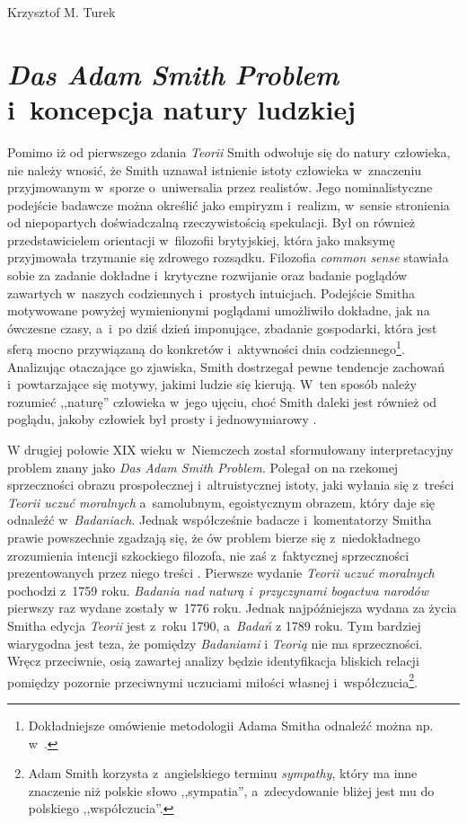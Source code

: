 \begin{artplenv}{Krzysztof M. Turek}
\section{\textit{Das Adam Smith Problem} i~koncepcja natury ludzkiej}

Pomimo iż od pierwszego zdania \textit{Teorii} Smith
\parencite*[s.~5]{smith_teoria_1989}
odwołuje się do natury
człowieka, nie należy wnosić, że Smith uznawał istnienie istoty człowieka w~znaczeniu
przyjmowanym w~sporze o~uniwersalia przez realistów. Jego nominalistyczne podejście
badawcze można określić jako empiryzm i~realizm, w~sensie
stronienia od niepopartych doświadczalną rzeczywistością spekulacji. Był on również przedstawicielem
orientacji w~filozofii brytyjskiej, która jako maksymę przyjmowała trzymanie się zdrowego rozsądku.
Filozofia \textit{common sense} stawiała sobie za zadanie dokładne i~krytyczne
rozwijanie oraz badanie poglądów zawartych w~naszych
codziennych i~prostych intuicjach. Podejście Smitha motywowane powyżej
wymienionymi poglądami umożliwiło dokładne, jak na ówczesne
czasy, a~i~po dziś dzień imponujące, zbadanie gospodarki, która jest sferą mocno przywiązaną do konkretów i~aktywności
dnia codziennego\footnote{Dokładniejsze omówienie metodologii Adama Smitha odnaleźć
można np. w~\parencites[rozdz.~I–III]{fleischacker_adam_2005}[rozdz.~8 i~9]{myers_soul_1983}.
}. Analizując otaczające go
zjawiska, Smith dostrzegał pewne tendencje zachowań i~powtarzające się motywy, jakimi ludzie się kierują. W~ten sposób
należy rozumieć ,,naturę'' człowieka w~jego ujęciu, choć Smith daleki jest również od poglądu, jakoby człowiek był prosty
i jednowymiarowy
\parencite{lubinski_rola_2019}.

W drugiej połowie XIX wieku w~Niemczech został sformułowany interpretacyjny problem znany jako \textit{Das Adam Smith
Problem}. Polegał on na rzekomej sprzeczności obrazu prospołecznej i~altruistycznej istoty, jaki wyłania się z~treści
\textit{Teorii uczuć moralnych} a~samolubnym, egoistycznym obrazem, który daje się odnaleźć w~\textit{Badaniach}.
Jednak współcześnie badacze i~komentatorzy Smitha prawie powszechnie zgadzają się, że ów problem bierze
się z~niedokładnego zrozumienia intencji szkockiego filozofa, nie zaś z~faktycznej sprzeczności prezentowanych przez niego
treści
\parencite{wilson_adam_2006}.
Pierwsze wydanie \textit{Teorii uczuć moralnych} pochodzi z~1759
roku. \textit{Badania nad naturą i~przyczynami bogactwa narodów }pierwszy raz wydane zostały w~1776 roku. Jednak
najpóźniejsza wydana za życia Smitha edycja \textit{Teorii} jest z~roku 1790, a~\textit{Badań }z 1789 roku. Tym
bardziej wiarygodna jest teza, że pomiędzy \textit{Badaniami }i \textit{Teorią }nie ma sprzeczności. Wręcz przeciwnie,
osią zawartej analizy będzie identyfikacja bliskich relacji pomiędzy pozornie przeciwnymi uczuciami miłości
własnej i~współczucia\footnote{Adam Smith korzysta z~angielskiego terminu \textit{sympathy},
który ma inne znaczenie niż polskie
słowo ,,sympatia'', a~zdecydowanie bliżej jest mu do polskiego ,,współczucia''.}.


\end{artplenv}
